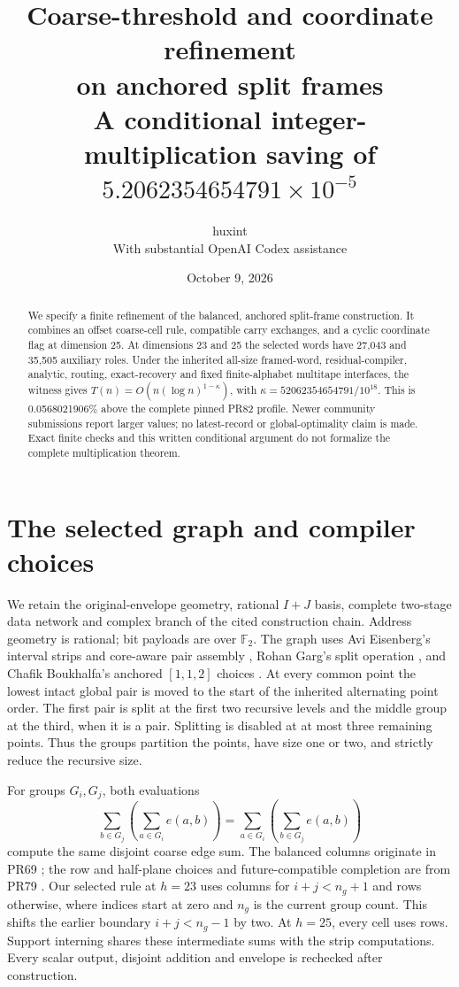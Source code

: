 \documentclass[11pt]{article}
\title{Coarse-threshold and coordinate refinement\\on anchored split frames\\
\large A conditional integer-multiplication saving of
\(5.2062354654791\times10^{-5}\)}
\author{huxint\\\small With substantial OpenAI Codex assistance}
\date{October 9, 2026}
\newcommand{\F}{\mathbb F_2}
\begin{document}
\maketitle
\begin{abstract}
We specify a finite refinement of the balanced, anchored split-frame
construction. It combines an offset coarse-cell rule, compatible carry
exchanges, and a cyclic coordinate flag at dimension 25. At dimensions 23
and 25 the selected words have 27,043 and 35,505 auxiliary roles. Under the
inherited all-size framed-word, residual-compiler, analytic, routing,
exact-recovery and fixed finite-alphabet multitape interfaces, the witness
gives \(T(n)=O(n(\log n)^{1-\kappa})\), with
\(\kappa=52062354654791/10^{18}\). This is 0.0568021906\% above the complete
pinned PR82 profile. Newer community submissions report larger values; no
latest-record or global-optimality claim is made. Exact finite checks and this
written conditional argument do not formalize the complete multiplication theorem.
\end{abstract}

\section{The selected graph and compiler choices}
We retain the original-envelope geometry, rational \(I+J\) basis, complete
two-stage data network and complex branch of the cited construction chain.
Address geometry is rational; bit payloads are over \(\F\). The graph uses
Avi Eisenberg's interval strips and core-aware pair assembly \cite{pr62},
Rohan Garg's split operation \cite{pr59}, and Chafik Boukhalfa's anchored
\([1,1,2]\) choices \cite{pr71}. At every common point the lowest intact
global pair is moved to the start of the inherited alternating point order.
The first pair is split at the first two recursive levels and the middle
group at the third, when it is a pair. Splitting is disabled at at most
three remaining points. Thus the groups partition the points, have size one
or two, and strictly reduce the recursive size.

For groups \(G_i,G_j\), both evaluations
\[
 \sum_{b\in G_j}\left(\sum_{a\in G_i}e(a,b)\right)
 =\sum_{a\in G_i}\left(\sum_{b\in G_j}e(a,b)\right)       \tag{1}
\]
compute the same disjoint coarse edge sum. The balanced columns originate in
PR69 \cite{pr69}; the row and half-plane choices and future-compatible
completion are from PR79 \cite{pr79}. Our selected rule at \(h=23\) uses
columns for \(i+j<n_g+1\) and rows otherwise, where indices start at zero
and \(n_g\) is the current group count. This shifts the earlier boundary
\(i+j<n_g-1\) by two. At \(h=25\), every cell uses rows. Support interning
shares these intermediate sums with the strip computations. Every scalar
output, disjoint addition and envelope is rechecked after construction.
\end{document}

